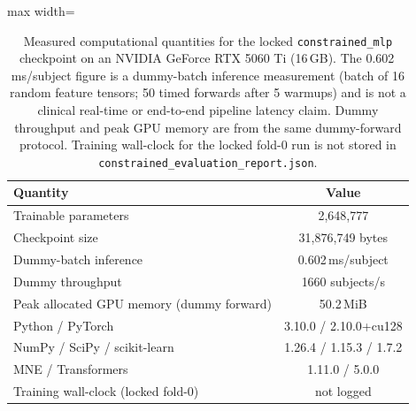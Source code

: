 \begin{table}[!t]
\centering
\footnotesize
\setlength{\tabcolsep}{3pt}
\caption{Measured computational quantities for the locked \texttt{constrained\_mlp} checkpoint on an NVIDIA GeForce RTX 5060 Ti (16\,GB). The 0.602\,ms/subject figure is a dummy-batch inference measurement (batch of 16 random feature tensors; 50 timed forwards after 5 warmups) and is not a clinical real-time or end-to-end pipeline latency claim. Dummy throughput and peak GPU memory are from the same dummy-forward protocol. Training wall-clock for the locked fold-0 run is not stored in \texttt{constrained\_evaluation\_report.json}.}
\label{tab:compute}
\begin{adjustbox}{max width=\columnwidth}
\begin{tabular}{@{}lc@{}}
\toprule
Quantity & Value \\
\midrule
Trainable parameters & 2{,}648{,}777 \\
Checkpoint size & 31{,}876{,}749 bytes \\
Dummy-batch inference & 0.602\,ms/subject \\
Dummy throughput & 1660 subjects/s \\
Peak allocated GPU memory (dummy forward) & 50.2\,MiB \\
Python / PyTorch & 3.10.0 / 2.10.0{+}cu128 \\
NumPy / SciPy / scikit-learn & 1.26.4 / 1.15.3 / 1.7.2 \\
MNE / Transformers & 1.11.0 / 5.0.0 \\
Training wall-clock (locked fold-0) & not logged \\
\bottomrule
\end{tabular}
\end{adjustbox}
\end{table}

